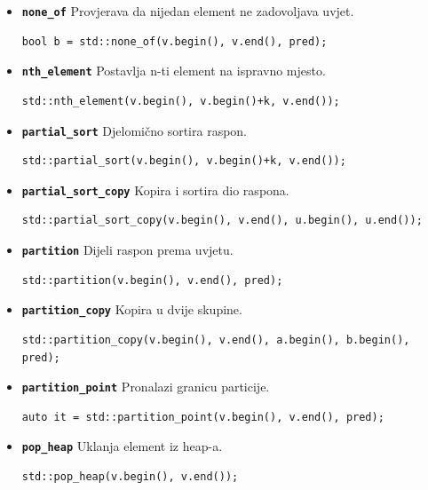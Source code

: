 \begin{itemize}
\item \textbf{\texttt{none\_of}}\newline
Provjerava da nijedan element ne zadovoljava uvjet.
\begin{verbatim}
bool b = std::none_of(v.begin(), v.end(), pred);
\end{verbatim}

\item \textbf{\texttt{nth\_element}}\newline
Postavlja n-ti element na ispravno mjesto.
\begin{verbatim}
std::nth_element(v.begin(), v.begin()+k, v.end());
\end{verbatim}

\item \textbf{\texttt{partial\_sort}}\newline
Djelomično sortira raspon.
\begin{verbatim}
std::partial_sort(v.begin(), v.begin()+k, v.end());
\end{verbatim}

\item \textbf{\texttt{partial\_sort\_copy}}\newline
Kopira i sortira dio raspona.
\begin{verbatim}
std::partial_sort_copy(v.begin(), v.end(), u.begin(), u.end());
\end{verbatim}

\item \textbf{\texttt{partition}}\newline
Dijeli raspon prema uvjetu.
\begin{verbatim}
std::partition(v.begin(), v.end(), pred);
\end{verbatim}

\item \textbf{\texttt{partition\_copy}}\newline
Kopira u dvije skupine.
\begin{verbatim}
std::partition_copy(v.begin(), v.end(), a.begin(), b.begin(), pred);
\end{verbatim}

\item \textbf{\texttt{partition\_point}}\newline
Pronalazi granicu particije.
\begin{verbatim}
auto it = std::partition_point(v.begin(), v.end(), pred);
\end{verbatim}

\item \textbf{\texttt{pop\_heap}}\newline
Uklanja element iz heap-a.
\begin{verbatim}
std::pop_heap(v.begin(), v.end());
\end{verbatim}


\end{itemize}
